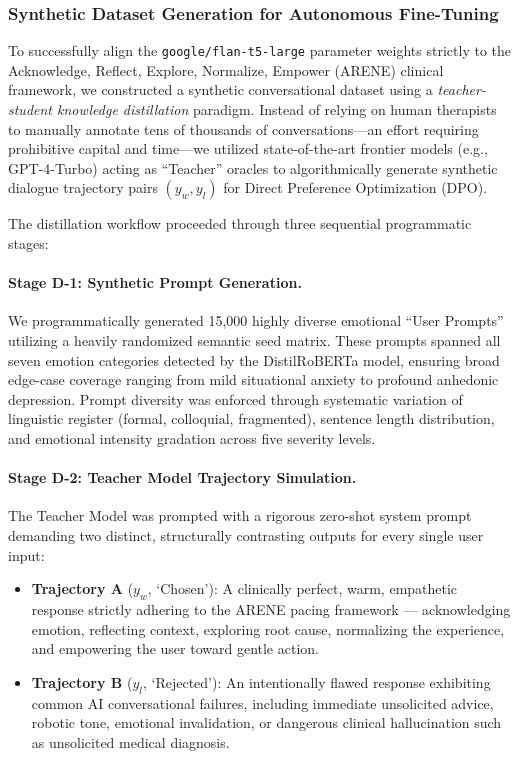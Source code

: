 \documentclass[12pt,twoside]{article}
\begin{document}
\subsubsection{Synthetic Dataset Generation for Autonomous Fine-Tuning}

To successfully align the \texttt{google/flan-t5-large} parameter weights strictly to the Acknowledge, Reflect, Explore, Normalize, Empower (ARENE) clinical framework, we constructed a synthetic conversational dataset using a \textit{teacher-student knowledge distillation} paradigm. Instead of relying on human therapists to manually annotate tens of thousands of conversations---an effort requiring prohibitive capital and time---we utilized state-of-the-art frontier models (e.g., GPT-4-Turbo) acting as ``Teacher'' oracles to algorithmically generate synthetic dialogue trajectory pairs $(y_w, y_l)$ for Direct Preference Optimization (DPO).

The distillation workflow proceeded through three sequential programmatic stages:

\paragraph{Stage D-1: Synthetic Prompt Generation.}
We programmatically generated 15,000 highly diverse emotional ``User Prompts'' utilizing a heavily randomized semantic seed matrix. These prompts spanned all seven emotion categories detected by the DistilRoBERTa model, ensuring broad edge-case coverage ranging from mild situational anxiety to profound anhedonic depression. Prompt diversity was enforced through systematic variation of linguistic register (formal, colloquial, fragmented), sentence length distribution, and emotional intensity gradation across five severity levels.

\paragraph{Stage D-2: Teacher Model Trajectory Simulation.}
The Teacher Model was prompted with a rigorous zero-shot system prompt demanding two distinct, structurally contrasting outputs for every single user input:
\begin{itemize}[leftmargin=2em]
  \item \textbf{Trajectory A} ($y_w$, `Chosen'): A clinically perfect, warm, empathetic response strictly adhering to the ARENE pacing framework --- acknowledging emotion, reflecting context, exploring root cause, normalizing the experience, and empowering the user toward gentle action.
  \item \textbf{Trajectory B} ($y_l$, `Rejected'): An intentionally flawed response exhibiting common AI conversational failures, including immediate unsolicited advice, robotic tone, emotional invalidation, or dangerous clinical hallucination such as unsolicited medical diagnosis.
\end{itemize}
\end{document}
